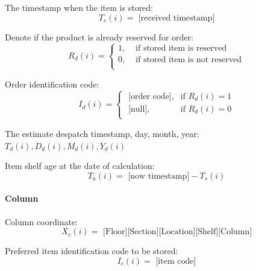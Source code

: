    The timestamp when the item is stored:
    \begin{equation}\label{eq:stored timestamp}
        T_s(i) = \text{ [received timestamp]}
    \end{equation}
    
    Denote if the product is already reserved for order: 
    \begin{equation}\label{eq:reserved}
        R_d(i) =
        \begin{cases}
            1, & \text{ if stored item is reserved} \\
            0, & \text{ if stored item is not reserved} \\
        \end{cases}
    \end{equation}
        
    Order identification code: 
    \begin{equation}\label{eq:order IC}
        I_d(i) =  
        \begin{cases}
            \text{ [order code]}, & \text{if  } R_d(i) = 1 \\
            \text{ [null]}, & \text{if  } R_d(i) = 0 \\
        \end{cases}
    \end{equation}
    
    The estimate despatch timestamp, day, month, year: \quad 
    ${T_d(i), D_d(i), M_d(i), Y_d(i)}$

    Item shelf age at the date of calculation: 
    \begin{equation}\label{slot shelf age}
        T_a(i) = \text{ [now timestamp]} - T_s(i)
    \end{equation}

\paragraph{Column}\mbox{}
    
    Column coordinate:
    \begin{equation}\label{eq:column coordinate}
        X_c(i) = \text{ [Floor][Section][Location][Shelf][Column]}
    \end{equation}
    
    Preferred item identification code to be stored:
    \begin{equation}\label{eq:prefered column IC}
        I_c(i) = \text{ [item code]}
    \end{equation}

